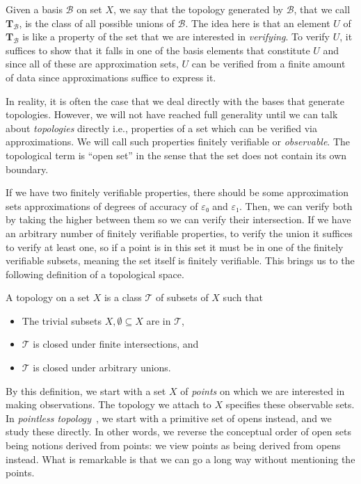 Given a basis $\mathcal{B}$ on set $X$, we say that the topology generated by
$\mathcal{B}$, that we call $\mathbf{T}_{\mathcal{B}}$, is the class of all possible
unions of $\mathcal{B}$. The idea here is that an element $U$ of
$\mathbf{T}_{\mathcal{B}}$ is like a property of the set that we are interested in
\emph{verifying}. To verify $U$, it suffices to show that it falls in one of the basis
elements that constitute $U$ and since all of these are approximation sets, $U$ can be
verified from a finite amount of data since approximations suffice to express it.

In reality, it is often the case that we deal directly with the bases that generate
topologies. However, we will not have reached full generality until we can talk about
\emph{topologies} directly i.e., properties of a set which can be verified via
approximations. We will call such properties finitely verifiable or \emph{observable}. The
topological term is ``open set'' in the sense that the set does not contain its own
boundary.

If we have two finitely verifiable properties, there should be some approximation sets
approximations of degrees of accuracy of $ε₀$ and $ε₁$. Then, we can verify both by taking
the higher between them so we can verify their intersection. If we have an arbitrary
number of finitely verifiable properties, to verify the union it suffices to verify at
least one, so if a point is in this set it must be in one of the finitely verifiable
subsets, meaning the set itself is finitely verifiable. This brings us to the following
definition of a topological space.
\begin{defn}\label{defn:topospace}
  A topology on a set $X$ is a class $\mathcal{T}$ of subsets of $X$ such that
  \begin{itemize}
    \item The trivial subsets $X, \emptyset \subseteq X$ are in $\mathcal{T}$,
    \item $\mathcal{T}$ is closed under finite intersections, and
    \item $\mathcal{T}$ is closed under arbitrary unions.
  \end{itemize}
\end{defn}

By this definition, we start with a set $X$ of \emph{points} on which we are interested in
making observations. The topology we attach to $X$ specifies these observable sets. In
\emph{pointless topology}~\cite{johnstone-the-point}, we start with a primitive set of
opens instead, and we study these directly. In other words, we reverse the conceptual
order of open sets being notions derived from points: we view points as being derived from
opens instead. What is remarkable is that we can go a long way without mentioning the
points.

